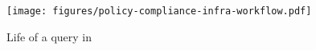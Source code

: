 \begin{figure}[t]
	\centering
	\texttt{[image: figures/policy-compliance-infra-workflow.pdf]}
	\caption{ Life of a query in \project{}}
	\label{fig:policy-compl-infra}
	\vspace{-1.5mm}
\end{figure}